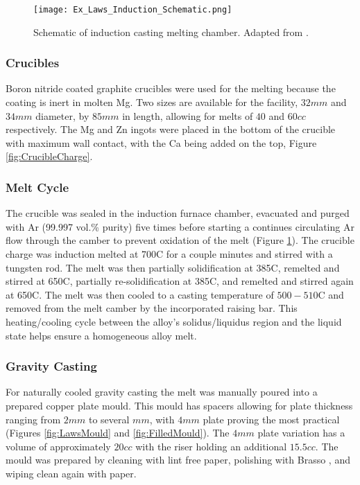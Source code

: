 \documentclass[a4paper,12pt,oneside]{report}%
\begin{document}
\begin{figure}[htbp]
	\centering
	\texttt{[image: Ex\_Laws\_Induction\_Schematic.png]}
	\caption[Schematic of induction casting melting chamber.]{Schematic of induction casting melting chamber. Adapted from \cite{Laws2007}.}
	\label{fig:CastingSchematic}
\end{figure}

\subsubsection{Crucibles}
Boron nitride coated graphite crucibles were used for the melting because the coating is inert in molten Mg. Two sizes are available for the facility, $32mm$ and $34mm$ diameter, by $85mm$ in length, allowing for melts of $40$ and $60cc$ respectively. The Mg and Zn ingots were placed in the bottom of the crucible with maximum wall contact, with the Ca being added on the top, Figure \ref{fig:CrucibleCharge}.

\subsubsection{Melt Cycle}
The crucible was sealed in the induction furnace chamber, evacuated and purged with Ar (99.997 vol.\% purity) five times before starting a continues circulating Ar flow through the camber to prevent oxidation of the melt (Figure \ref{fig:CastingSchematic}). The crucible charge was induction melted at 700\degree C for a couple minutes and stirred with a tungsten rod. The melt was then partially solidification at 385\degree C, remelted and stirred at 650\degree C, partially re-solidification at 385\degree C, and remelted and stirred again at 650\degree C. The melt was then cooled to a casting temperature of $500- 510$\degree C and removed from the melt camber by the incorporated raising bar. This heating/cooling cycle between the alloy's solidus/liquidus region and the liquid state helps ensure a homogeneous alloy melt. 

\subsubsection{Gravity Casting}
For naturally cooled gravity casting the melt was manually poured into a prepared copper plate mould. This mould has spacers allowing for plate thickness ranging from $2mm$ to several $mm$, with $4mm$ plate proving the most practical (Figures \ref{fig:LawsMould} and \ref{fig:FilledMould}). The $4mm$ plate variation has a volume of approximately $20cc$ with the riser holding an additional $15.5cc$. The mould was prepared by cleaning with lint free paper, polishing with Brasso \textcopyright, and wiping clean again with paper.
\end{document}
